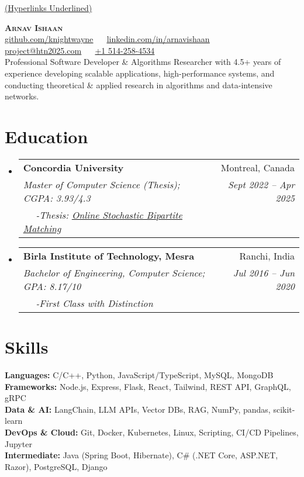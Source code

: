 \documentclass[letterpaper,11pt]{article}
\makeatletter
\newcommand{\resumeSubheadingM}[5]{\vspace{-2pt}\item
    \begin{tabular*}{0.97\textwidth}[t]{l@{\extracolsep{\fill}}r}
      \textbf{#1} & #2 \\
      \textit{\small#3} & \textit{\small #4} \\
      \textit{$\quad$ -\small #5} \\
    \end{tabular*}\vspace{-4pt}}
\newcommand{\resumeSubHeadingListStart}{\begin{itemize}[leftmargin=0.15in, label={}]}
\newcommand{\resumeSubHeadingListEnd}{\end{itemize}}
\makeatother
\begin{document}
\vspace*{-0.95cm}
\hfill \small\underline{(Hyperlinks Underlined)}

\vspace{-1.5em}
\begin{center}
    \textbf{\Huge \scshape Arnav Ishaan} \\ \vspace{4pt}
    \small 
     \href{https://github.com/knightwayne}{\underline{github.com/knightwayne}} $  \quad $
     \href{https://www.linkedin.com/in/arnavishaan}{\underline{linkedin.com/in/arnavishaan}} $ \quad $
     \href{mailto:project@htn2025.com}{\underline{project@htn2025.com}} $\quad $
     \href{tel:+1 514-258-4534}{+1 514-258-4534} \\
    \vspace{2pt}
    Professional Software Developer \& Algorithms Researcher with 4.5+ years of experience developing scalable applications, high-performance systems, and conducting theoretical \& applied research in algorithms and data-intensive networks.
\end{center}

\vspace{-2em}
\section{Education}
\resumeSubHeadingListStart
\resumeSubheadingM
{Concordia University}{Montreal, Canada}{Master of Computer Science (Thesis); CGPA: 3.93/4.3}{Sept 2022 -- Apr 2025}{Thesis: \it{\href{https://drive.google.com/file/d/1HY21GIft4gsGM4JQ7fOTGsPogXB8sxtV/view?usp=sharing}{\underline{Online Stochastic Bipartite Matching}}}}
\resumeSubheadingM
{Birla Institute of Technology, Mesra}{Ranchi, India}{Bachelor of Engineering, Computer Science; GPA: 8.17/10}{Jul 2016 -- Jun 2020}{First Class with Distinction}
\resumeSubHeadingListEnd


\vspace{-1.5em}
\section{Skills}
\begin{itemize}[leftmargin=0.15in, label={}]
    \small{
    \item{
    \textbf{Languages:} C/C++, Python, JavaScript/TypeScript, MySQL, MongoDB \\
    \textbf{Frameworks:} Node.js, Express, Flask, React, Tailwind, REST API, GraphQL, gRPC \\
    \textbf{Data \& AI:}  LangChain, LLM APIs, Vector DBs, RAG, NumPy, pandas, scikit-learn \\
    \textbf{DevOps \& Cloud:} Git, Docker, Kubernetes, Linux, Scripting, CI/CD Pipelines, Jupyter \\
    \textbf{Intermediate:} Java (Spring Boot, Hibernate), C\# (.NET Core, ASP.NET, Razor), PostgreSQL, Django
    }}
\end{itemize}
\end{document}
